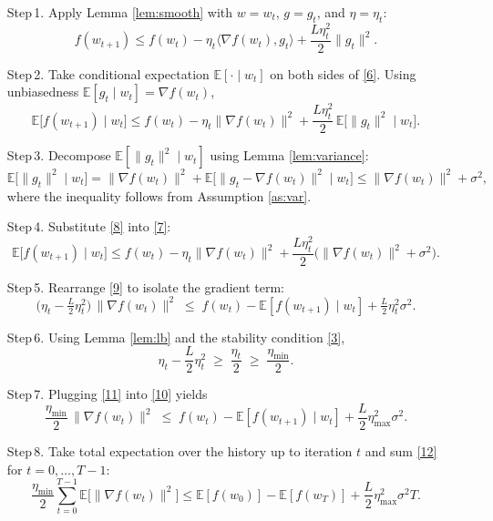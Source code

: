 \documentclass[11pt]{article}
\begin{document}
\begin{enumerate}
\item[Step 1.] Apply Lemma \ref{lem:smooth} with $w=w_t$, $g=g_t$, and $\eta=\eta_t$:
\[
f(w_{t+1})\le f(w_t)-\eta_t\langle\nabla f(w_t),g_t\rangle+\frac{L\eta_t^{2}}{2}\|g_t\|^{2}.
\tag{6}
\]

\item[Step 2.] Take conditional expectation $\mathbb{E}[\cdot\mid w_t]$ on both sides of \eqref{6}. Using unbiasedness $\mathbb{E}[g_t\mid w_t]=\nabla f(w_t)$,
\[
\mathbb{E}\big[f(w_{t+1})\mid w_t\big]\le
f(w_t)-\eta_t\|\nabla f(w_t)\|^{2}
+\frac{L\eta_t^{2}}{2}\,\mathbb{E}\big[\|g_t\|^{2}\mid w_t\big].
\tag{7}
\]

\item[Step 3.] Decompose $\mathbb{E}[\|g_t\|^{2}\mid w_t]$ using Lemma \ref{lem:variance}:
\[
\mathbb{E}\big[\|g_t\|^{2}\mid w_t\big]
= \|\nabla f(w_t)\|^{2}+\mathbb{E}\big[\|g_t-\nabla f(w_t)\|^{2}\mid w_t\big]
\le \|\nabla f(w_t)\|^{2}+\sigma^{2},
\tag{8}
\]
where the inequality follows from Assumption \ref{as:var}.

\item[Step 4.] Substitute \eqref{8} into \eqref{7}:
\[
\mathbb{E}\big[f(w_{t+1})\mid w_t\big]\le
f(w_t)-\eta_t\|\nabla f(w_t)\|^{2}
+\frac{L\eta_t^{2}}{2}\big(\|\nabla f(w_t)\|^{2}+\sigma^{2}\big).
\tag{9}
\]

\item[Step 5.] Rearrange \eqref{9} to isolate the gradient term:
\[
\big(\eta_t-\tfrac{L}{2}\eta_t^{2}\big)\,\|\nabla f(w_t)\|^{2}
\;\le\;
f(w_t)-\mathbb{E}[f(w_{t+1})\mid w_t]
+\tfrac{L}{2}\eta_t^{2}\sigma^{2}.
\tag{10}
\]

\item[Step 6.] %
Using Lemma \ref{lem:lb} and the stability condition \eqref{3},
\[
\eta_t-\frac{L}{2}\eta_t^{2}\;\ge\;\frac{\eta_t}{2}\;\ge\;\frac{\eta_{\min}}{2}.
\tag{11}
\]

\item[Step 7.] Plugging \eqref{11} into \eqref{10} yields
\[
\frac{\eta_{\min}}{2}\,\|\nabla f(w_t)\|^{2}
\;\le\;
f(w_t)-\mathbb{E}[f(w_{t+1})\mid w_t]
+\frac{L}{2}\eta_{\max}^{2}\sigma^{2}.
\tag{12}
\]

\item[Step 8.] Take total expectation over the history up to iteration $t$ and sum \eqref{12} for $t=0,\dots,T-1$:
\[
\frac{\eta_{\min}}{2}\sum_{t=0}^{T-1}\mathbb{E}\big[\|\nabla f(w_t)\|^{2}\big]
\le
\mathbb{E}[f(w_0)]-\mathbb{E}[f(w_T)]
+ \frac{L}{2}\eta_{\max}^{2}\sigma^{2}T .
\tag{13}
\]


\end{enumerate}
\end{document}
